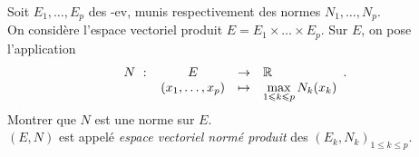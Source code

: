 Soit $E_1,\ldots,E_p$ des \K-ev, munis respectivement des normes $N_1,\ldots,N_p$.\\
On considère l'espace vectoriel produit $E=E_1\times\ldots\times E_p$. Sur $E$, on pose l'application
$$N\ :\
\begin{array}[t]{ccl}
  E&\rightarrow&\mathbb{R}\\
  (x_1,\ldots,x_p)&\mapsto &\displaystyle\max_{1\leqslant k\leqslant p} N_k(x_k)\end{array}.
$$
Montrer que $N$ est une norme sur $E$.\\
$(E,N)$ est appelé \emph{espace vectoriel normé produit} des $(E_k,N_k)_{1\leqslant k\leqslant p}$.
